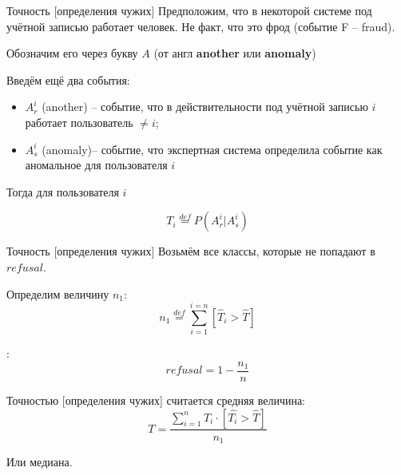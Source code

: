 \begin{frame}{Точность [определения чужих]}
	\small
	Предположим, что в некоторой системе под учётной записью 
	работает  человек.
	Не факт, что это фрод (событие F -- fraud).
	
	Обозначим его через букву $A$ (от англ \textbf{another} или \textbf{anomaly})
	
	Введём ещё два события:
	\begin{itemize}
		\item $A_r^i$ (another) -- событие, что в действительности под учётной записью $i$
		работает пользователь $\neq i$;
		\item $A_s^i$ (anomaly)-- событие, что экспертная система определила событие
		как аномальное для пользователя $i$
	\end{itemize}

	Тогда 	
	для пользователя $i$	

	\begin{equation}\label{eq:ueba_presicion_def}
	T_i \stackrel{def}{=} P (A_r^i | A_s^i)
	\end{equation}
\end{frame}

\begin{frame}{Точность [определения чужих]}
	\small
	Возьмём все классы, которые не попадают в $refusal$.
	
	Определим величину $n_1$:
	\begin{equation}
	n_1 \stackrel{def}{=} \sum_{i=1}^{i=n} \left[\hat T_i > \hat T \right]	
	\end{equation}
	
	:
	\begin{equation}
	refusal = 1 - \frac{n_1}{n}
	\end{equation}
	
	Точностью [определения чужих] считается средняя величина:
	\begin{equation}\label{eq:ueba_presicion_def_equation}
	T = \frac{\sum_{i=1}^{n} T_i \cdot \left [\hat{T_i} > \hat T \right]}{n_1} 
	\end{equation}
	
	Или медиана.
\end{frame}


